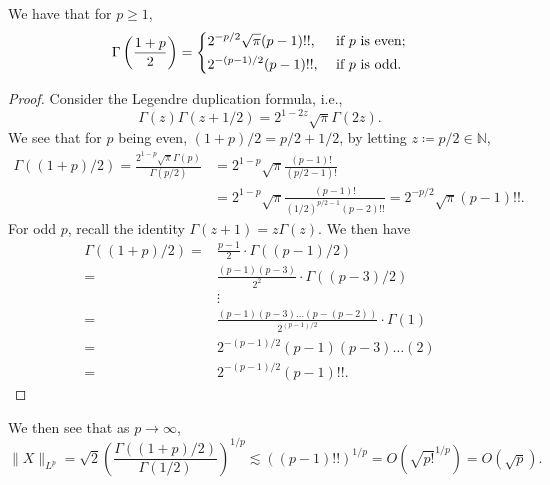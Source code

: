 \begin{answer}
	\begin{lemma}
		We have that for \(p \geq 1\),
		\[
			\Gamma \left( \frac{1+p}{2} \right) = \begin{dcases}
				2^{-p / 2}\sqrt{\pi } (p-1)!!, & \text{ if \(p\) is even}  ; \\
				2^{-(p-1) / 2} (p-1)!!,        & \text{ if \(p\) is odd} .
			\end{dcases}
		\]
	\end{lemma}
	\begin{proof}
		Consider the Legendre duplication formula, i.e.,
		\[
			\Gamma (z) \Gamma (z + 1 / 2) = 2^{1 - 2z} \sqrt{\pi } \Gamma (2z).
		\]
		We see that for \(p\) being even, \((1 + p) / 2 = p / 2 + 1 / 2\), by letting \(z \coloneqq p / 2 \in \mathbb{N} \),
		\[
			\begin{split}
				\Gamma ((1 + p) / 2)
				= \frac{2^{1 - p} \sqrt{\pi } \Gamma (p)}{\Gamma (p / 2)}
				 & = 2^{1 - p} \sqrt{\pi } \frac{(p-1)!}{(p / 2 - 1)!}                  \\
				 & = 2^{1 - p} \sqrt{\pi } \frac{(p-1)!}{(1 / 2)^{p / 2 - 1} (p - 2)!!}
				=2^{-p / 2} \sqrt{\pi } (p-1)!!.
			\end{split}
		\]
		For odd \(p\), recall the identity \(\Gamma (z + 1) = z \Gamma (z)\). We then have
		\begin{align*}
			\Gamma ((1 + p) / 2)
			= & \frac{p-1}{2} \cdot \Gamma ((p - 1) / 2)                                                           \\
			= & \frac{(p-1) (p-3)}{2^2} \cdot \Gamma ((p - 3) / 2)                                                 \\
			  & \vdots                                                                                             \\
			= & \frac{(p-1)(p-3) \dots (p - (p - 2))}{2^{(p-1) / 2}} \cdot \Gamma (1) \tag*{\(2 = (p - (p - 2))\)} \\
			= & 2^{-(p-1) / 2} (p-1)(p-3) \dots (2)                                                                \\
			= & 2^{-(p-1) / 2} (p-1)!!.
		\end{align*}
	\end{proof}

	We then see that as \(p \to \infty \),
	\[
		\lVert X \rVert _{L^p}
		= \sqrt{2} \left( \frac{\Gamma ((1 + p) / 2)}{\Gamma (1 / 2)} \right) ^{1 / p}
		\lesssim \left( (p-1)!! \right) ^{1 / p}
		= O(\sqrt{p!}^{1 / p} )
		= O(\sqrt{p} ).
	\]
\end{answer}


